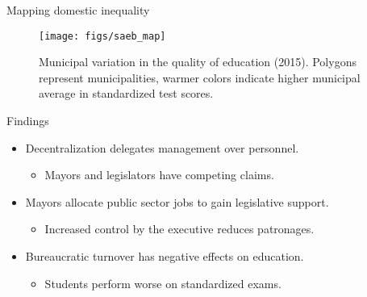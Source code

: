 \documentclass[ignorenonframetext,]{beamer}
\providecommand{\tightlist}{%
  \setlength{\itemsep}{0pt}\setlength{\parskip}{0pt}}
\begin{document}
\begin{frame}{Mapping domestic inequality}
\protect\hypertarget{mapping-domestic-inequality}{}

\begin{figure}

{\centering \texttt{[image: figs/saeb\_map]} 

}

\caption{Municipal variation in the quality of education (2015). Polygons represent municipalities, warmer colors indicate higher municipal average in standardized test scores.}\label{fig:unnamed-chunk-3}
\end{figure}

\end{frame}

\begin{frame}{Findings}
\protect\hypertarget{findings}{}

\begin{itemize}
\tightlist
\item
  Decentralization delegates management over personnel.

  \begin{itemize}
  \tightlist
  \item
    Mayors and legislators have competing claims.
  \end{itemize}
\item
  Mayors allocate public sector jobs to gain legislative support.

  \begin{itemize}
  \tightlist
  \item
    Increased control by the executive reduces patronages.
  \end{itemize}
\item
  Bureaucratic turnover has negative effects on education.

  \begin{itemize}
  \tightlist
  \item
    Students perform worse on standardized exams.
  \end{itemize}
\end{itemize}

\end{frame}
\end{document}
